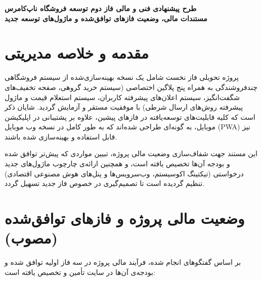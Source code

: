 \documentclass[11pt,a4paper]{article}
\begin{document}
\begin{center}
    \vspace*{1cm}
    {\Huge\bfseries طرح پیشنهادی فنی و مالی فاز دوم توسعه فروشگاه ناپ‌کامرس} \\[0.6cm]
    {\Large\bfseries مستندات مالی، وضعیت فازهای توافق‌شده و ماژول‌های توسعه جدید} \\[1.5cm]
\end{center}

\tableofcontents
\newpage

\section{مقدمه و خلاصه مدیریتی}
پروژه تحویلی فاز نخست شامل یک نسخه بهینه‌سازی‌شده از سیستم فروشگاهی چندفروشندگی  به همراه پنج پلاگین اختصاصی (سیستم خرید گروهی، صفحه تخفیف‌های شگفت‌انگیز، سیستم اعلان‌های پیشرفته کاربران، سیستم استعلام قیمت  و ماژول پیشرفته روش‌های ارسال شرطی) با موفقیت مستقر و آزمایش گردید. شایان ذکر است که کلیه قابلیت‌های توسعه‌یافته در فازهای پیشین، علاوه بر پشتیبانی در اپلیکیشن موبایل، به گونه‌ای طراحی شده‌اند که به طور کامل در نسخه وب موبایل (PWA) نیز قابل استفاده و بهینه‌سازی شده باشند.

این مستند جهت شفاف‌سازی وضعیت مالی پروژه، تبیین مواردی که پیش‌تر توافق شده و بودجه آن‌ها تخصیص یافته است، و همچنین ارائه‌ی چارچوب ماژول‌های جدید درخواستی (تیکتینگ اکوسیستم، وب‌سرویس‌ها و پنل‌های هوش مصنوعی اقتصادی) تنظیم گردیده است تا تصمیم‌گیری در خصوص فاز جدید تسهیل گردد.

\section{وضعیت مالی پروژه و فازهای توافق‌شده (مصوب)}
بر اساس گفتگوهای انجام شده، فرآیند مالی پروژه در سه فاز اولیه توافق شده و بودجه‌ی آن‌ها در سایت تأمین و تخصیص یافته است:
\end{document}
